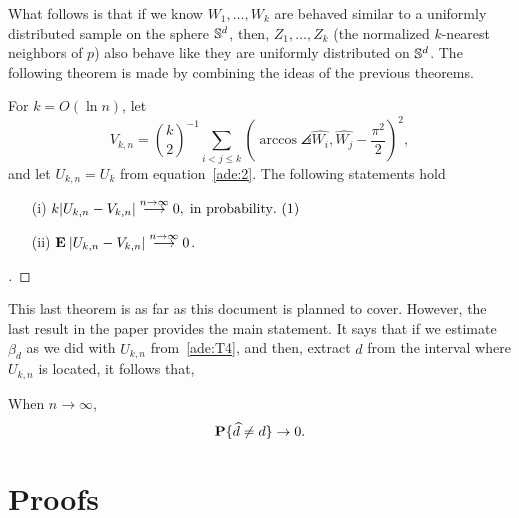 \vspace*{0.5 em}

What follows is that if we know $W_1,\ldots, W_k$ are behaved similar to a uniformly distributed sample on the sphere $\S^d$, then, $Z_1,\ldots, Z_k$ (the normalized $k$-nearest neighbors of $p$) also behave like they are uniformly distributed on $\S^d$. The following theorem is made by combining the ideas of the previous theorems.

\begin{theorem}\label{ade:T4}
  For $k = O(\ln n)$, let
  \begin{equation}\label{ade:8}
    V_{k,n} = \binom{k}{2}^{-1} \sum_{i<j\leq k}{\left(
      \arccos\angles{\widehat{W_i}, \widehat{W_j}} - \frac{\pi^2}{2} 
      \right)}^{2},
  \end{equation}
  and let $U_{k,n} = U_k$ from equation~\ref{ade:2}. The following statements hold
  \begin{enumerate}
    \item[(i)]    \( k |U_{k,n} - V_{k,n}| \overset{n\to\infty}{\longrightarrow} 0,\;\mbox{in probability}. \hfill\inlinetag  \)
    \item[(ii)]    \( \E |U_{k,n} - V_{k,n}| \overset{n\to\infty}{\longrightarrow} 0\).
  \end{enumerate}
\end{theorem}
\begin{proof}[]

\end{proof}

\vspace*{0.5 em}

This last theorem is as far as this document is planned to cover. However, the last result in the paper provides the main statement. It says that if we estimate $\beta_d$ as we did with $U_{k,n}$ from~\ref{ade:T4}, and then, extract $\widehat{d}$ from the interval where $U_{k,n}$ is located, it follows that,
\begin{theorem}[Consistency]\label{ade:T5}
  When $n\to \infty$,
  \[ \P\{\widehat{d} \neq d\} \to 0.\]
\end{theorem}

\section{Proofs}

